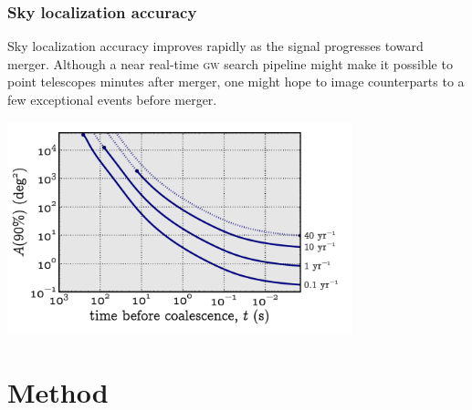\documentclass{beamer}
\begin{document}
\begin{frame}
	\frametitle{Sky localization accuracy}
	Sky localization accuracy improves rapidly as the signal progresses toward merger.  Although a near real-time \textsc{gw} search pipeline might make it possible to point telescopes minutes after merger, one might hope to image counterparts to a few exceptional events before merger.

	\begin{center}
		\includegraphics[width=0.75\textwidth]{figures/loc_in_time}
	\end{center}
\end{frame}

\section{Method}
\end{document}
